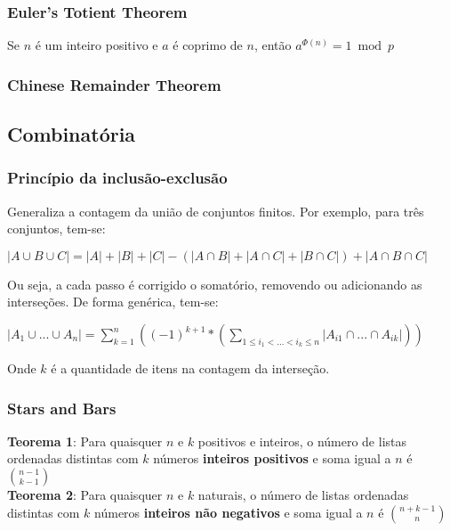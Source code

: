 \subsubsection{Euler's Totient Theorem}
Se $n$ \'{e} um inteiro positivo e $a$ \'{e} coprimo de $n$, ent\~{a}o
$a^{\Phi (n) } = 1 \bmod{p}$
\divisor

\subsubsection{Chinese Remainder Theorem}
\divisor


\subsection{Combinat\'{o}ria}

\subsubsection{Princ\'{i}pio da inclus\~{a}o-exclus\~{a}o}
Generaliza a contagem da uni\~{a}o de conjuntos finitos. Por exemplo, para tr\^{e}s conjuntos, tem-se:

$|A \cup B \cup C| = |A| + |B| + |C| - (|A \cap B| + |A \cap C| + |B \cap C|) + |A \cap B \cap C|$

Ou seja, a cada passo \'{e} corrigido o somat\'{o}rio, removendo ou adicionando as interse\c{c}\~{o}es. De forma gen\'{e}rica, tem-se:

$|A_1 \cup ... \cup A_n| = \sum_{k=1}^{n} ((-1)^{k+1}*(\sum_{1 \leq i_1 < ... < i_k \leq n} |A_{i1} \cap ... \cap A_{ik}|))$

Onde $k$ \'{e} a quantidade de itens na contagem da interse\c{c}\~{a}o.

\divisor

\subsubsection{Stars and Bars}
\textbf{Teorema 1}: Para quaisquer $n$ e $k$ positivos e inteiros, o n\'{u}mero de listas ordenadas distintas com $k$ n\'{u}meros \textbf{inteiros positivos} e soma igual a $n$ \'{e} ${n-1 \choose k-1}$ \\

\textbf{Teorema 2}: Para quaisquer $n$ e $k$ naturais, o n\'{u}mero de listas ordenadas distintas com $k$ n\'{u}meros \textbf{inteiros n\~{a}o negativos} e soma igual a $n$ \'{e} ${n+k-1 \choose n}$

